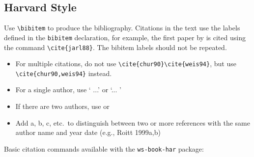 \subsection{Harvard Style}

Use \verb|\bibitem| to produce the bibliography.  Citations in the
text use the labels defined in the \verb|bibitem| declaration, for example,
the first paper by \cite{jarl88} is cited using the command
\verb|\cite{jarl88}|. The bibitem labels should not be repeated.

\begin{itemize}
\item For multiple citations, do not use \verb|\cite{chur90}\cite{weis94}|, but use
\verb|\cite{chur90,weis94}| instead.
\item For a single author, use `\citet{weis94} ...' or
`... \cite{weis94}'
\item If there are two authors, use \cite{chur90} or \citep{chur90}
\item Add a, b, c, etc.~to distinguish between two or
more references with the same author name and year date (e.g., Roitt
1999a,b)
\end{itemize}

\newpage

Basic citation commands available with the \verb|ws-book-har| package:

\


